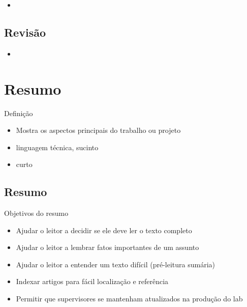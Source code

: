 \documentclass{beamer}
\begin{document}
\begin{frame}{}
  \begin{itemize}
  \item 
  \end{itemize}
\end{frame}

\subsection{Revisão}

\begin{frame}{}
  \begin{itemize}
  \item 
  \end{itemize}
\end{frame}

\section{Resumo}

\begin{frame}{Definição}
  \begin{itemize}
  \item Mostra os aspectos principais do trabalho ou projeto
  \item linguagem técnica, sucinto
  \item curto
  \end{itemize}
\end{frame}

\subsection{Resumo}

\begin{frame}{Objetivos do resumo}
  \begin{itemize}
  \item Ajudar o leitor a decidir se ele deve ler o texto completo


  \item Ajudar o leitor a lembrar fatos importantes de um assunto


  \item Ajudar o leitor a entender um texto difícil (pré-leitura
    sumária)

  \item Indexar artigos para fácil localização e referência

  \item Permitir que supervisores se mantenham atualizados na produção
    do lab
  \end{itemize}
\end{frame}
\end{document}
